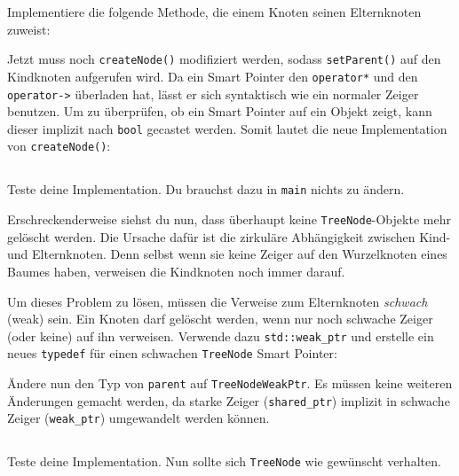 Implementiere die folgende Methode, die einem Knoten seinen Elternknoten zuweist:



Jetzt muss noch \lstinline{createNode()} modifiziert werden, sodass \lstinline{setParent()} auf den Kindknoten aufgerufen wird.
Da ein Smart Pointer den \lstinline{operator*} und den \lstinline{operator->} überladen hat, lässt er sich syntaktisch wie ein normaler Zeiger benutzen. Um zu überprüfen, ob ein Smart Pointer auf ein Objekt zeigt, kann dieser implizit nach \lstinline{bool} gecastet werden. Somit lautet die neue Implementation von \lstinline{createNode()}:


\subsection{}
Teste deine Implementation.
Du brauchst dazu in \lstinline{main} nichts zu ändern.

Erschreckenderweise siehst du nun, dass überhaupt keine \lstinline{TreeNode}-Objekte mehr gelöscht werden.
Die Ursache dafür ist die zirkuläre Abhängigkeit zwischen Kind- und Elternknoten.
Denn selbst wenn sie keine Zeiger auf den Wurzelknoten eines Baumes haben, verweisen die Kindknoten noch immer darauf.

Um dieses Problem zu lösen, müssen die Verweise zum Elternknoten \emph{schwach} (weak) sein.
Ein Knoten darf gelöscht werden, wenn nur noch schwache Zeiger (oder keine) auf ihn verweisen.
Verwende dazu \lstinline{std::weak_ptr} und erstelle ein neues \lstinline{typedef} für einen schwachen \lstinline{TreeNode} Smart Pointer:


Ändere nun den Typ von \lstinline{parent} auf \lstinline{TreeNodeWeakPtr}.
Es müssen keine weiteren Änderungen gemacht werden, da starke Zeiger (\lstinline{shared_ptr}) implizit in schwache Zeiger (\lstinline{weak_ptr}) umgewandelt werden können.


\subsection{}
Teste deine Implementation.
Nun sollte sich \lstinline{TreeNode} wie gewünscht verhalten.
